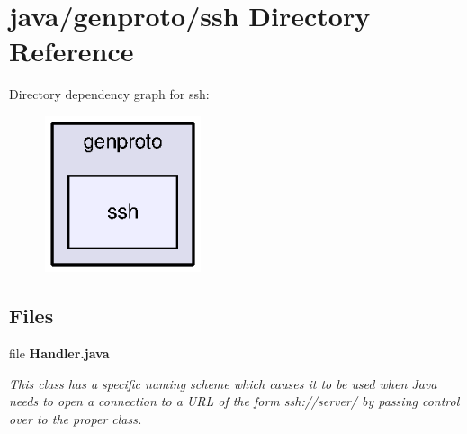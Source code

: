 \section{java/genproto/ssh Directory Reference}
\label{dir_9ed736c8effb5cabd84b76b7f43a9f07}
Directory dependency graph for ssh\+:\nopagebreak
\begin{figure}[H]
\begin{center}
\leavevmode
\includegraphics[width=130pt]{dir_9ed736c8effb5cabd84b76b7f43a9f07_dep}
\end{center}
\end{figure}
\subsection*{Files}
\begin{DoxyCompactItemize}
\item 
file {\bf Handler.\+java}
\begin{DoxyCompactList}\small\item\em This class has a specific naming scheme which causes it to be used when Java needs to open a connection to a U\+R\+L of the form ssh\+://server/ by passing control over to the proper class. \end{DoxyCompactList}\end{DoxyCompactItemize}
